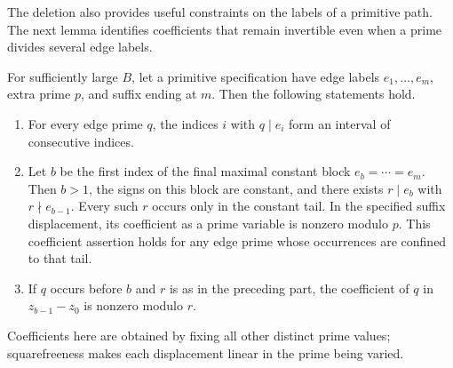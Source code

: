 The deletion also provides useful constraints on the labels of a
primitive path.  The next lemma identifies coefficients that remain
invertible even when a prime divides several edge labels.

\begin{lemma}
\label{lem:primitive-properties}
For sufficiently large $B$, let a primitive specification have edge
labels $e_1,\ldots,e_m$, extra prime $p$, and suffix ending at $m$.
Then the following statements hold.
\begin{enumerate}
\item For every edge prime $q$, the indices $i$ with $q\mid e_i$
form an interval of consecutive indices.
\item Let $b$ be the first index of the final maximal constant block
$e_b=\cdots=e_m$.  Then $b>1$, the signs on this block are constant,
and there exists $r\mid e_b$ with $r\nmid e_{b-1}$.  Every such $r$
occurs only in the constant tail.  In the specified suffix
displacement, its coefficient as a prime variable is nonzero modulo
$p$.  This coefficient assertion holds for any edge prime whose
occurrences are confined to that tail.
\item If $q$ occurs before $b$ and $r$ is as in the preceding part,
the coefficient of $q$ in $z_{b-1}-z_0$ is nonzero modulo $r$.
\end{enumerate}
Coefficients here are obtained by fixing all other distinct prime
values; squarefreeness makes each displacement linear in the prime
being varied.
\end{lemma}

